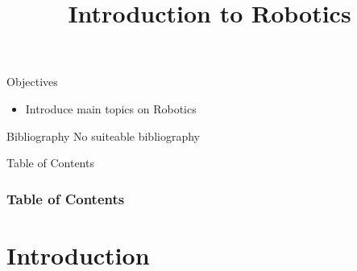 \documentclass[10pt,compress]{beamer} %
\title[Introduction to Robotics]{Introduction to Robotics}
\author{}
\institute{\asignatura}
\date{}
\begin{document}
{\titlepageBlue
    \begin{frame}
        \titlepage
    \end{frame}
}

\begin{frame}[plain]{}
   \begin{block}{Objectives}
       \begin{itemize}
        \item Introduce main topics on Robotics
       \end{itemize}
   \end{block}

   \begin{block}{Bibliography}
       No suiteable bibliography
   \end{block}
\end{frame}

{
\begin{frame}[shrink]{Table of Contents}
 \frametitle{Table of Contents}
 \tableofcontents
\end{frame}
}

\section{Introduction}
\end{document}
